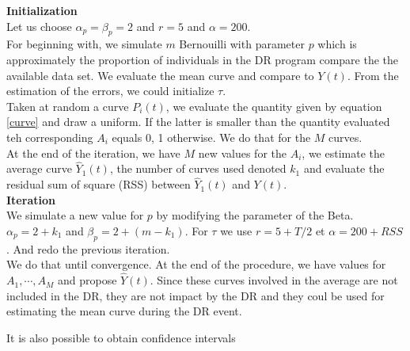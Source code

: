 \documentclass[journal]{IEEEtran}
\begin{document}
{\bf Initialization}\\
Let us choose $\alpha_p=\beta_p=2$ and $r=5$ and $\alpha=200$.\\
For beginning with, we simulate $m$ Bernouilli with parameter $p$ which
is approximately the proportion of individuals in the DR program compare
the the available data set. We evaluate the mean curve and compare to
$Y(t)$. From the estimation of the errors, we could initialize $\tau$.\\
Taken at random a curve $P_i(t)$, we evaluate the quantity given by
equation \ref{curve} and draw a uniform. If the latter is smaller than
the quantity evaluated teh corresponding $A_i$ equals 0, 1 otherwise.
We do that for the $M$ curves.\\
At the end of the iteration, we have $M$ new values for the $A_i$,
we estimate the average curve $\hat Y_1(t)$, the number of curves used
denoted $k_1$ and evaluate the residual sum of square (RSS) between
$\hat Y_1(t)$ and $Y(t)$. \\
{\bf Iteration}\\
We simulate a new value for $p$ by modifying the parameter of the Beta.
$\alpha_p= 2 + k_1$ and $\beta_p=2 +(m-k_1)$. For $\tau$
we use $r=5+T/2$ et $\alpha=200+RSS$. And redo the previous iteration.\\
We do that until convergence. At the end of the procedure, we have
values for $A_1,\cdots,A_M$ and propose $\hat Y(t)$. Since these
curves involved in the average are not included in the DR, they are not
impact by the DR and they coul be used for estimating the mean curve during
the DR event.

It is also possible to obtain confidence intervals
\end{document}
